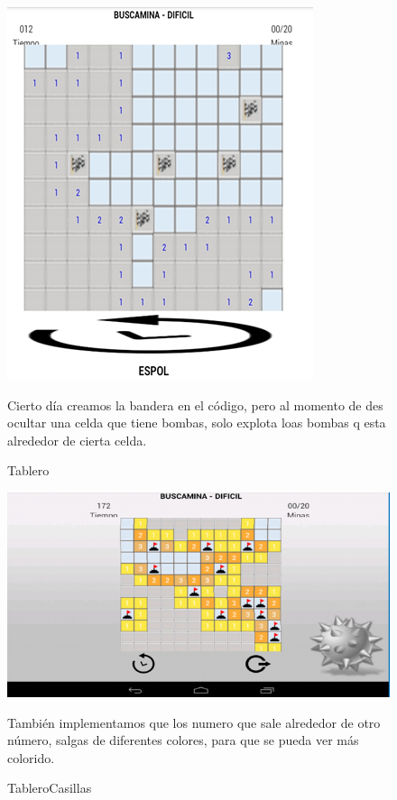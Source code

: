 \begin{figure}[htbp]
\begin{center}
\includegraphics[width=.70\textwidth]{./imagenes/tableroBoton.png}
\caption{Tablero}
\end{center}

Cierto día creamos la bandera en el código, pero al momento de des ocultar una celda que tiene bombas, solo explota loas bombas q esta alrededor de cierta celda.
\end{figure}

\begin{figure}[htbp]
\begin{center}
\includegraphics[width=.70\textwidth]{./imagenes/tableroCasilas.png}
\caption{TableroCasillas}
\end{center}

También implementamos que los numero que sale alrededor de otro número, salgas de diferentes colores, para que se pueda ver más colorido.
\end{figure}

